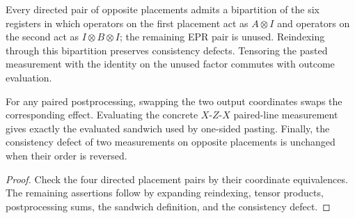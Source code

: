 \begin{lemma}
	\label{lem:qld-opposite-bipartition-transport}
	\leanok
	Every directed pair of opposite placements admits a bipartition of the six
	registers in which operators on the first placement act as $A\otimes I$ and
	operators on the second act as $I\otimes B\otimes I$; the remaining EPR
	pair is unused. Reindexing through this bipartition preserves consistency
	defects. Tensoring the pasted measurement with the identity on the unused
	factor commutes with outcome evaluation.

	For any paired postprocessing, swapping the two output coordinates swaps the
	corresponding effect. Evaluating the concrete $X$-$Z$-$X$ paired-line
	measurement gives exactly the evaluated sandwich used by one-sided pasting.
	Finally, the consistency defect of two measurements on opposite placements
	is unchanged when their order is reversed.
\end{lemma}
\begin{proof}
	\leanok
	Check the four directed placement pairs by their coordinate equivalences.
	The remaining assertions follow by expanding reindexing, tensor products,
	postprocessing sums, the sandwich definition, and the consistency defect.
\end{proof}

